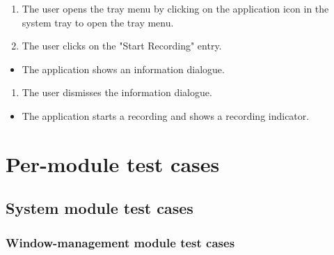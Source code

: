 \begin{tests}
    {\begin{enumerate}
        \item The \gls{user} opens the tray menu by clicking on the application icon in the system tray to open the tray menu.
        \item The \gls{user} clicks on the "Start Recording" entry.
    \end{enumerate}}
    {\begin{itemize}
        \item The application shows an information dialogue.
    \end{itemize}}
    
    {\begin{enumerate}
        \item The user dismisses the information dialogue.
    \end{enumerate}}
    {\begin{itemize}
        \item The application starts a recording and shows a recording indicator.
    \end{itemize}}
    
\end{tests}

\section{Per-module test cases}

\subsection{System module test cases}

\subsubsection{Window-management module test cases}

